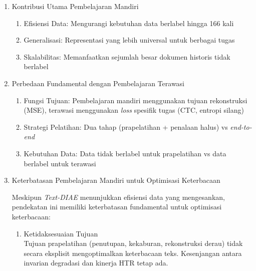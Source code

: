 \begin{enumerate}[leftmargin=*, labelindent=0pt, itemsep=1ex, topsep=0pt]

\item Kontribusi Utama Pembelajaran Mandiri

\begin{enumerate}[leftmargin=1.5em, labelsep=0.5em, itemindent=0pt, label=\alph*., topsep=0pt, parsep=0pt, itemsep=0pt]
      \item Efisiensi Data: Mengurangi kebutuhan data berlabel hingga 166 kali
      \item Generalisasi: Representasi yang lebih universal untuk berbagai tugas
      \item Skalabilitas: Memanfaatkan sejumlah besar dokumen historis tidak berlabel
\end{enumerate}

\item Perbedaan Fundamental dengan Pembelajaran Terawasi

\begin{enumerate}[leftmargin=1.5em, labelsep=0.5em, itemindent=0pt, label=\alph*., topsep=0pt, parsep=0pt, itemsep=0pt]
      \item Fungsi Tujuan: Pembelajaran mandiri menggunakan tujuan rekonstruksi (MSE), terawasi menggunakan \textit{loss} spesifik tugas (CTC, entropi silang)
      \item Strategi Pelatihan: Dua tahap (prapelatihan + penalaan halus) vs \textit{end-to-end}
      \item Kebutuhan Data: Data tidak berlabel untuk prapelatihan vs data berlabel untuk terawasi
\end{enumerate}

\item Keterbatasan Pembelajaran Mandiri untuk Optimisasi Keterbacaan

Meskipun \textit{Text-DIAE} menunjukkan efisiensi data yang mengesankan, pendekatan ini memiliki keterbatasan fundamental untuk optimisasi keterbacaan:

\begin{enumerate}[leftmargin=1.5em, labelsep=0.5em, itemindent=0pt, label=\alph*., topsep=0pt, parsep=0pt, itemsep=0pt]
      \item Ketidaksesuaian Tujuan \mbox{}\\[0.1em]
            Tujuan prapelatihan (penutupan, kekaburan, rekonstruksi derau) tidak secara eksplisit mengoptimalkan keterbacaan teks. Kesenjangan antara invarian degradasi dan kinerja HTR tetap ada.


\end{enumerate}
\end{enumerate}
